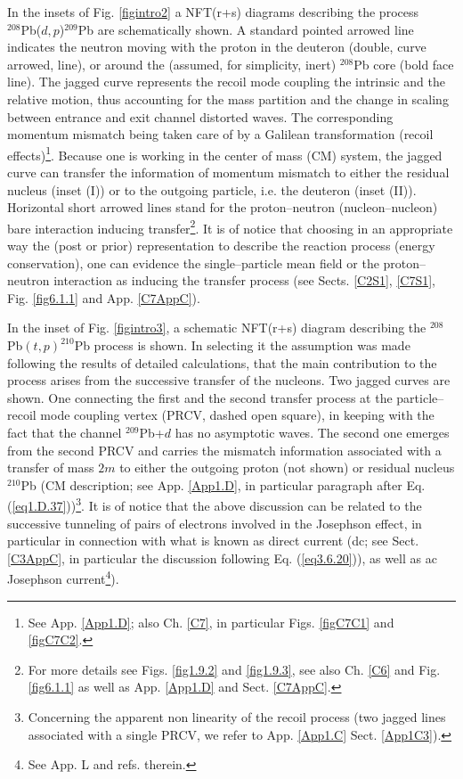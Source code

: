 In the insets of Fig. \ref{figintro2} a NFT(r+s)  diagrams describing the process\\ \mbox{$^{208}$Pb($d,p$)$^{209}$Pb} are schematically shown. A standard pointed arrowed line indicates the neutron moving with the proton in the deuteron (double, curve arrowed, line), or around the (assumed, for simplicity, inert) $^{208}$Pb core (bold face line). The jagged curve represents the recoil  mode coupling the intrinsic and the relative motion,  thus accounting for the mass partition  and the change in scaling between entrance and exit channel distorted waves. The corresponding momentum mismatch being taken care of by a  Galilean transformation (recoil effects)\footnote{See App. \ref{App1.D}; also Ch. \ref{C7}, in particular Figs. \ref{figC7C1} and \ref{figC7C2}.}. Because one is working in the center of mass (CM) system, the jagged curve can transfer the information of momentum mismatch to either the residual nucleus (inset (I)) or to the outgoing particle, i.e. the deuteron (inset (II)).  Horizontal short arrowed lines stand for the proton--neutron (nucleon--nucleon) bare interaction inducing transfer\footnote{For more details see  Figs.  \ref{fig1.9.2} and \ref{fig1.9.3}, see also Ch. \ref{C6} and Fig. \ref{fig6.1.1} as well as App. \ref{App1.D} and Sect. \ref{C7AppC}.}. It is of notice that choosing in an appropriate way the (post or prior) representation to describe the reaction process (energy conservation), one can evidence the single--particle mean field or the proton--neutron interaction as inducing the transfer process (see Sects. \ref{C2S1}, \ref{C7S1}, Fig. \ref{fig6.1.1} and App. \ref{C7AppC}).


In the inset of Fig. \ref{figintro3}, a schematic NFT(r+s) diagram describing the $^{208}$Pb$(t,p)^{210}$Pb process is shown. In selecting it the assumption was made following the results of detailed calculations, that the main contribution to the process arises from the successive transfer of the nucleons. Two jagged curves are shown. One connecting the first and the second transfer process at the particle--recoil mode coupling vertex (PRCV, dashed open square), in keeping with the fact that the channel $^{209}$Pb+$d$ has no asymptotic waves. The second one emerges from the second PRCV and carries the mismatch information associated with a transfer of mass $2m$ to either the outgoing proton (not shown) or residual nucleus $^{210}$Pb (CM description; see App. \ref{App1.D}, in particular paragraph after Eq. (\ref{eq1.D.37}))\footnote{Concerning the apparent non linearity of the recoil process (two jagged lines associated with a single PRCV, we refer to App. \ref{App1.C} Sect. \ref{App1C3}).}. It is of notice that the above discussion can be related to the successive tunneling of pairs of electrons involved in the Josephson effect, in particular in connection with what is known as direct current (dc; see Sect. \ref{C3AppC}, in particular the discussion following Eq. (\ref{eq3.6.20})), as well as ac Josephson current\footnote{See \cite{Brink:05} App. L and refs. therein.}). 


